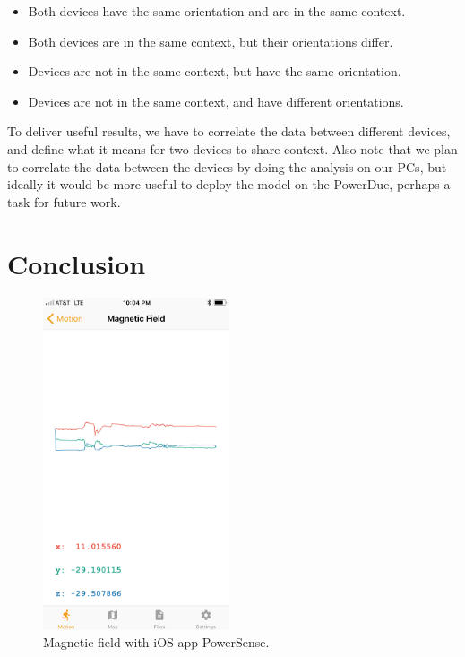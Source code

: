 \documentclass[journal]{IEEEtranTIE}
\begin{document}
\begin{itemize}
\item Both devices have the same orientation and are in the same context.
\item Both devices are in the same context, but their orientations differ.
\item Devices are not in the same context, but have the same orientation.
\item Devices are not in the same context, and have different orientations.
\end{itemize}

To deliver useful results, we have to correlate the data between different
devices, and define what it means for two devices to share context. Also note
that we plan to correlate the data between the devices by doing the
analysis on our PCs, but ideally it would be more useful to deploy the model
on the PowerDue, perhaps a task for future work.

\section{Conclusion}

\begin{figure}[!t]\centering
	\includegraphics[width=5.5cm]{magnetic_field}
	\caption{Magnetic field with iOS app PowerSense.}\label{fig:fig3}
\end{figure}



\ %
\end{document}
